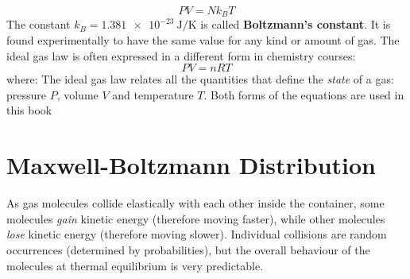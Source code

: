 \begin{equation}
  \boxed{PV=Nk_BT}
\end{equation}
The constant $k_B=\SI{1.381e-23}{\joule\per\kelvin}$ is called
\textbf{Boltzmann's constant}. It is found experimentally to have the same
value for any kind or amount of gas.
%
%
%
%
The ideal gas law is often expressed in a different form in chemistry courses:  
\begin{equation}
  \boxed{PV=nRT}
\end{equation}
where:
The ideal gas law relates all the quantities that define the \emph{state} of a
gas: pressure $P$, volume $V$ and temperature $T$. Both forms of the equations
are used in this book



\section{Maxwell-Boltzmann Distribution}

As gas molecules collide elastically with each other inside the container,
some molecules \emph{gain} kinetic energy (therefore moving faster), while
other molecules \emph{lose} kinetic energy (therefore moving slower).
Individual collisions are random occurrences (determined by probabilities), but
the overall behaviour of the molecules at thermal equilibrium is very
predictable.

